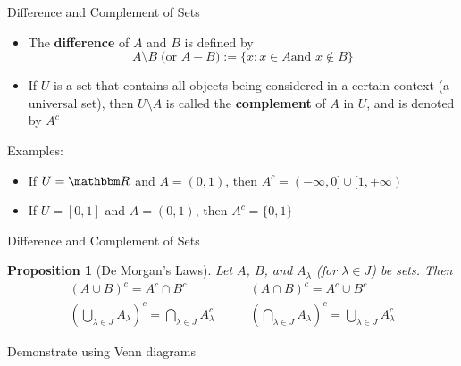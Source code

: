 \documentclass[9pt,aspectratio=169]{beamer}
\newcommand{\RR}{\mathbbm R}
\newtheorem{proposition}[theorem]{Proposition}
\begin{document}
\begin{frame}{Difference and Complement of Sets}
    \begin{definition}
        \begin{itemize}
            \item The \textbf{difference} of $A$ and $B$ is defined by
            \begin{equation*}
                A \setminus B \;\big(\text{or } A - B) := \{x: x \in A \text{
                  and } x \notin B\}
            \end{equation*}
            \item If $U$ is a set that contains all objects being considered
            in a certain context (a universal set), then $U \setminus A$ is
            called the \textbf{complement} of $A$ in $U$, and is denoted by
            $A^c$
        \end{itemize}        
    \end{definition}
    Examples:
    \begin{itemize}
        \item If $U = \RR$ and $A = (0, 1)$, then $A^c = (-\infty, 0] \cup
        [1, +\infty)$
        \item If $U = [0, 1]$ and $A = (0, 1)$, then $A^c = \{0, 1\}$
    \end{itemize}
\end{frame}

\begin{frame}{Difference and Complement of Sets}
    \begin{proposition}[De Morgan's Laws]
        Let $A$, $B$, and $A_\lambda$ (for $\lambda \in J$) be sets. Then
        \begin{align*}
            (A \cup B)^c = A^c \cap B^c &\qquad (A \cap B)^c = A^c \cup B^c\\
            \left(\bigcup_{\lambda \in J} A_\lambda \right)^c =
            \bigcap_{\lambda \in J} A_\lambda^c &\qquad \left(\bigcap_{\lambda
                  \in J} A_\lambda \right)^c = \bigcup_{\lambda \in J}
            A_\lambda^c
        \end{align*}
    \end{proposition}
    Demonstrate using Venn diagrams
\end{frame}
\end{document}
